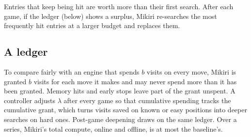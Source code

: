 Entries that keep being hit are worth more than their first search. After each game, if the ledger (below) shows a surplus, Mikiri re-searches the most frequently hit entries at a larger budget and replaces them.

\subsection{A ledger}

To compare fairly with an engine that spends $b$ visits on every move, Mikiri is granted $b$ visits for each move it makes and may never spend more than it has been granted. Memory hits and early stops leave part of the grant unspent. A controller adjusts $\lambda$ after every game so that cumulative spending tracks the cumulative grant, which turns visits saved on known or easy positions into deeper searches on hard ones. Post-game deepening draws on the same ledger. Over a series, Mikiri's total compute, online and offline, is at most the baseline's.
